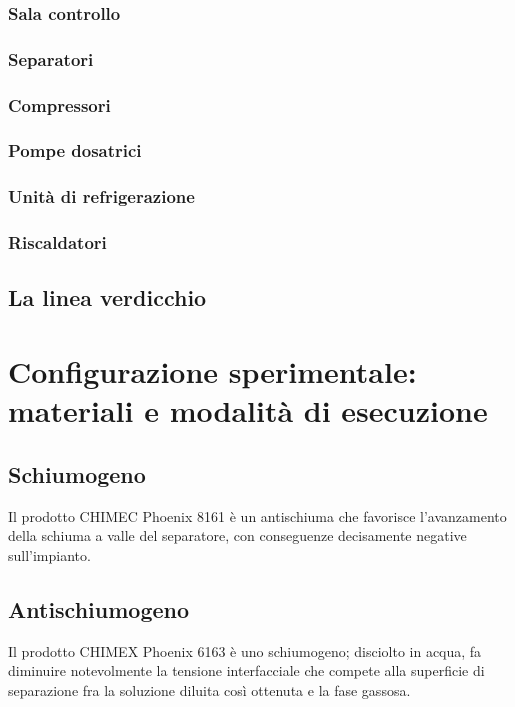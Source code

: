 \subsubsection{Sala controllo}
\subsubsection{Separatori}
\subsubsection{Compressori}
\subsubsection{Pompe dosatrici}
\subsubsection{Unità di refrigerazione}
\subsubsection{Riscaldatori}
\subsection{La linea verdicchio}

\section{Configurazione sperimentale: materiali e modalità di esecuzione}
\subsection{Schiumogeno}
Il prodotto CHIMEC Phoenix 8161 è un antischiuma che favorisce l'avanzamento della schiuma a valle del separatore, con conseguenze decisamente negative sull'impianto.
\subsection{Antischiumogeno}
Il prodotto CHIMEX Phoenix 6163 è uno schiumogeno; disciolto in acqua, fa diminuire notevolmente la tensione interfacciale che compete alla superficie di separazione fra la soluzione diluita così ottenuta e la fase gassosa.

